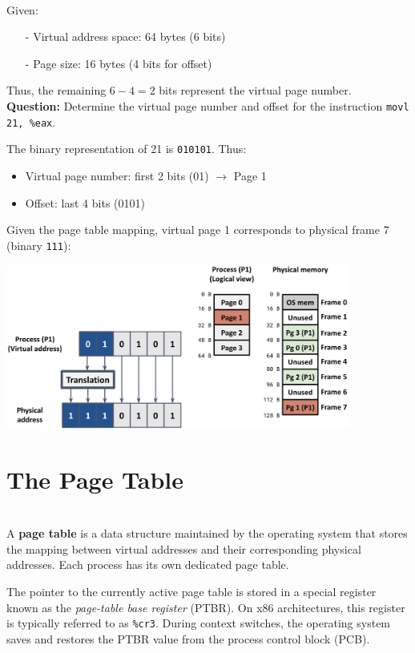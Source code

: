 \documentclass[../../compsys.tex]{subfiles}
\begin{document}
\begin{example}
\leavevmode
\\[5px]
Given:
\begin{itemize}
  \item[-] Virtual address space: 64 bytes (6 bits)
  \item[-] Page size: 16 bytes (4 bits for offset)
\end{itemize}

Thus, the remaining $6 - 4 = 2$ bits represent the virtual page number.\\[5px]

\textbf{Question:} Determine the virtual page number and offset for the instruction \texttt{movl 21, \%eax}.

The binary representation of 21 is \texttt{010101}. Thus:
\begin{itemize}
  \item Virtual page number: first 2 bits (01) $\rightarrow$ Page 1
  \item Offset: last 4 bits (0101)
\end{itemize}

Given the page table mapping, virtual page 1 corresponds to physical frame 7 (binary \texttt{111}):

\begin{center}
  \includegraphics[width=0.85\textwidth]{chapters/L5/images/paging-example4.png}
\end{center}
\end{example}

\section{The Page Table}

\begin{definition}
\leavevmode
\\[2px]
A \textbf{page table} is a data structure maintained by the operating system that stores the mapping between virtual addresses and their corresponding physical addresses. Each process has its own dedicated page table.

The pointer to the currently active page table is stored in a special register known as the \textit{page-table base register} (PTBR). On x86 architectures, this register is typically referred to as \texttt{\%cr3}. During context switches, the operating system saves and restores the PTBR value from the process control block (PCB).
\end{definition}
\end{document}
